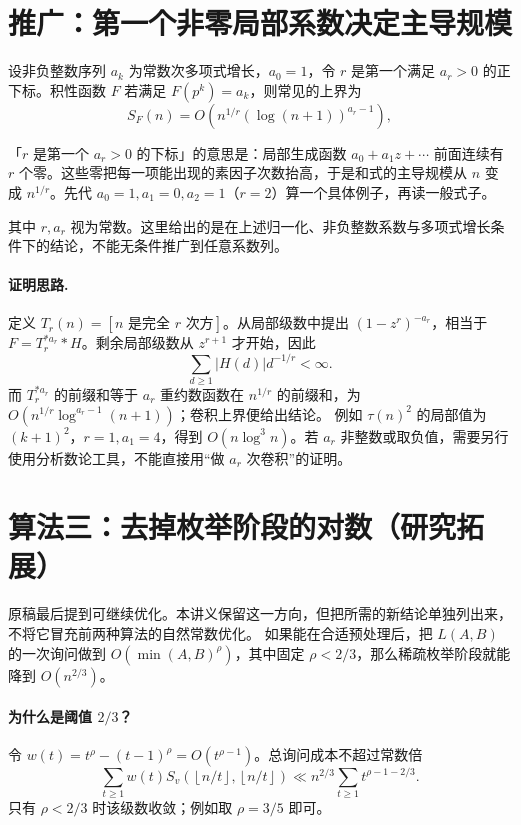 \documentclass[UTF8,a4paper,11pt,twoside,openright,fontset=fandol]{ctexbook}
\theoremstyle{definition}
\newcommand{\floor}[1]{\left\lfloor #1\right\rfloor}
\begin{document}
\section{推广：第一个非零局部系数决定主导规模}
设非负整数序列 $a_k$ 为常数次多项式增长，$a_0=1$，令 $r$ 是第一个满足 $a_r>0$ 的正下标。积性函数 $F$ 若满足 $F(p^k)=a_k$，则常见的上界为
\[
 S_F(n)=O\left(n^{1/r}(\log(n+1))^{a_r-1}\right),
\]

\begin{tip}
「$r$ 是第一个 $a_r>0$ 的下标」的意思是：局部生成函数 $a_0+a_1z+\cdots$ 前面连续有 $r$ 个零。这些零把每一项能出现的素因子次数抬高，于是和式的主导规模从 $n$ 变成 $n^{1/r}$。先代 $a_0=1,a_1=0,a_2=1$（$r=2$）算一个具体例子，再读一般式子。
\end{tip}

其中 $r,a_r$ 视为常数。这里给出的是在上述归一化、非负整数系数与多项式增长条件下的结论，不能无条件推广到任意系数列。

\paragraph{证明思路.} 定义 $T_r(n)=[n\text{ 是完全 }r\text{ 次方}]$。从局部级数中提出 $(1-z^r)^{-a_r}$，相当于 $F=T_r^{*a_r}*H$。剩余局部级数从 $z^{r+1}$ 才开始，因此
\[
 \sum_{d\ge1}|H(d)|d^{-1/r}<\infty.
\]
而 $T_r^{*a_r}$ 的前缀和等于 $a_r$ 重约数函数在 $n^{1/r}$ 的前缀和，为 $O(n^{1/r}\log^{a_r-1}(n+1))$；卷积上界便给出结论。
例如 $\tau(n)^2$ 的局部值为 $(k+1)^2$，$r=1,a_1=4$，得到 $O(n\log^3 n)$。若 $a_r$ 非整数或取负值，需要另行使用分析数论工具，不能直接用“做 $a_r$ 次卷积”的证明。


\section{算法三：去掉枚举阶段的对数（研究拓展）}
原稿最后提到可继续优化。本讲义保留这一方向，但把所需的新结论单独列出来，不将它冒充前两种算法的自然常数优化。
如果能在合适预处理后，把 $L(A,B)$ 的一次询问做到 $O(\min(A,B)^\rho)$，其中固定 $\rho<2/3$，那么稀疏枚举阶段就能降到 $O(n^{2/3})$。

\paragraph{为什么是阈值 $2/3$？}
令 $w(t)=t^\rho-(t-1)^\rho=O(t^{\rho-1})$。总询问成本不超过常数倍
\[
\sum_{t\ge1}w(t)S_v(\floor{n/t},\floor{n/t})
\ll n^{2/3}\sum_{t\ge1}t^{\rho-1-2/3}.
\]
只有 $\rho<2/3$ 时该级数收敛；例如取 $\rho=3/5$ 即可。
\end{document}
